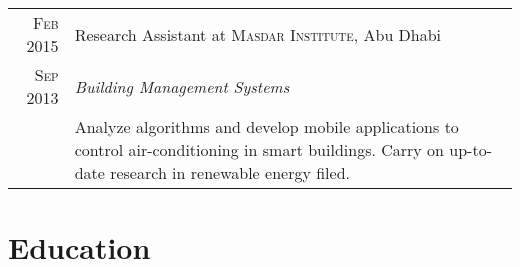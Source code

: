 \documentclass[a4paper,10pt]{article} %
\begin{document}
\begin{tabular}{r|p{11cm}}
\textsc{Feb 2015} & Research Assistant at
\textsc{Masdar Institute}, Abu Dhabi \\ 
\textsc{Sep 2013} & \emph{Building Management Systems}\\ 
& \footnotesize{Analyze algorithms and develop mobile
  applications to control air-conditioning in smart buildings. Carry
  on up-to-date research in renewable energy filed.}\\ 




\end{tabular}


\section{Education}
\end{document}
